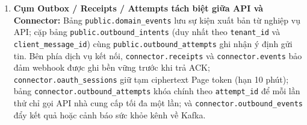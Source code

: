 \begin{enumerate}
    Bảng \texttt{messaging\_\hspace{0pt}connections} dùng chỉ mục \texttt{uq\_\hspace{0pt}messaging\_\hspace{0pt}connections\_\hspace{0pt}active\_\hspace{0pt}page} trên cặp cột \texttt{platform} và \texttt{account\_\hspace{0pt}id} với điều kiện \texttt{status <> 'disconnected'} để cưỡng chế một Facebook Page hoặc một Telegram Bot chỉ gắn với một doanh nghiệp đang hoạt động, trong khi giữ lại bản ghi \texttt{disconnected} cũ cho lịch sử.
    Bảng \texttt{channel\_\hspace{0pt}oauth\_\hspace{0pt}states} lưu \texttt{state\_\hspace{0pt}hash} dùng một lần; \texttt{messaging\_\hspace{0pt}ingress} chống xử lý lặp theo \texttt{identity}; và \texttt{messaging\_\hspace{0pt}ingress\_\hspace{0pt}quarantine} lưu dấu cách ly gói hỏng.
  \item \textbf{Cụm Outbox / Receipts / Attempts tách biệt giữa API và Connector:} Bảng \texttt{public.\hspace{0pt}domain\_\hspace{0pt}events} lưu sự kiện xuất bản từ nghiệp vụ API; cặp bảng \texttt{public.\hspace{0pt}outbound\_\hspace{0pt}intents} (duy nhất theo \texttt{tenant\_\hspace{0pt}id} và \texttt{client\_\hspace{0pt}message\_\hspace{0pt}id}) cùng \texttt{public.\hspace{0pt}outbound\_\hspace{0pt}attempts} ghi nhận ý định gửi tin.
    Bên phía dịch vụ kết nối, \texttt{connector.\hspace{0pt}receipts} và \texttt{connector.\hspace{0pt}events} bảo đảm webhook được ghi bền vững trước khi trả ACK; \texttt{connector.\hspace{0pt}oauth\_\hspace{0pt}sessions} giữ tạm ciphertext Page token (hạn 10 phút); bảng \texttt{connector.\hspace{0pt}outbound\_\hspace{0pt}attempts} khóa chính theo \texttt{attempt\_\hspace{0pt}id} để mỗi lần thử chỉ gọi API nhà cung cấp tối đa một lần; và \texttt{connector.\hspace{0pt}outbound\_\hspace{0pt}events} đẩy kết quả hoặc cảnh báo sức khỏe kênh về Kafka.
\end{enumerate}


